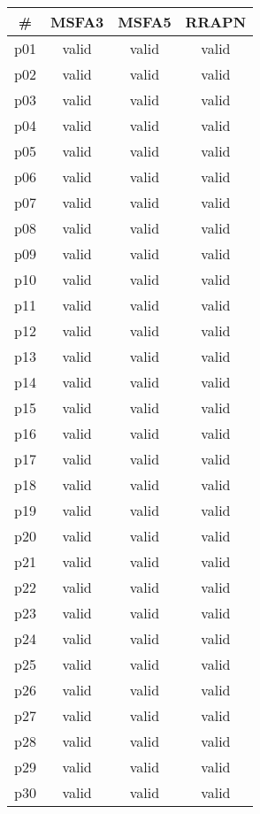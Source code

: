 \begin{tabular}{c||c|c|c}
\textbf{\#} & \textbf{MSFA3} & \textbf{MSFA5} & \textbf{RRAPN}\\
\hline
\hline
p01 & valid & valid & valid\\
p02 & valid & valid & valid\\
p03 & valid & valid & valid\\
p04 & valid & valid & valid\\
p05 & valid & valid & valid\\
p06 & valid & valid & valid\\
p07 & valid & valid & valid\\
p08 & valid & valid & valid\\
p09 & valid & valid & valid\\
p10 & valid & valid & valid\\
p11 & valid & valid & valid\\
p12 & valid & valid & valid\\
p13 & valid & valid & valid\\
p14 & valid & valid & valid\\
p15 & valid & valid & valid\\
p16 & valid & valid & valid\\
p17 & valid & valid & valid\\
p18 & valid & valid & valid\\
p19 & valid & valid & valid\\
p20 & valid & valid & valid\\
p21 & valid & valid & valid\\
p22 & valid & valid & valid\\
p23 & valid & valid & valid\\
p24 & valid & valid & valid\\
p25 & valid & valid & valid\\
p26 & valid & valid & valid\\
p27 & valid & valid & valid\\
p28 & valid & valid & valid\\
p29 & valid & valid & valid\\
p30 & valid & valid & valid\\
\end{tabular}

